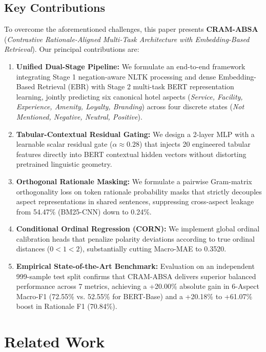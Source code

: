 \documentclass{llncs}
\begin{document}
\subsection{Key Contributions}
\label{subsec:key_contributions}
To overcome the aforementioned challenges, this paper presents \textbf{CRAM-ABSA} (\textit{Contrastive Rationale-Aligned Multi-Task Architecture with Embedding-Based Retrieval}). Our principal contributions are:
\begin{enumerate}[label=(\roman*)]
    \item \textbf{Unified Dual-Stage Pipeline:} We formulate an end-to-end framework integrating Stage 1 negation-aware NLTK processing and dense Embedding-Based Retrieval (EBR) with Stage 2 multi-task BERT representation learning, jointly predicting six canonical hotel aspects (\textit{Service, Facility, Experience, Amenity, Loyalty, Branding}) across four discrete states (\textit{Not Mentioned, Negative, Neutral, Positive}).
    \item \textbf{Tabular-Contextual Residual Gating:} We design a 2-layer MLP with a learnable scalar residual gate ($\alpha \approx 0.28$) that injects 20 engineered tabular features directly into BERT contextual hidden vectors without distorting pretrained linguistic geometry.
    \item \textbf{Orthogonal Rationale Masking:} We formulate a pairwise Gram-matrix orthogonality loss on token rationale probability masks that strictly decouples aspect representations in shared sentences, suppressing cross-aspect leakage from 54.47\% (BM25-CNN) down to 0.24\%.
    \item \textbf{Conditional Ordinal Regression (CORN):} We implement global ordinal calibration heads that penalize polarity deviations according to true ordinal distances ($0 < 1 < 2$), substantially cutting Macro-MAE to 0.3520.
    \item \textbf{Empirical State-of-the-Art Benchmark:} Evaluation on an independent 999-sample test split confirms that CRAM-ABSA delivers superior balanced performance across 7 metrics, achieving a +20.00\% absolute gain in 6-Aspect Macro-F1 (72.55\% vs. 52.55\% for BERT-Base) and a +20.18\% to +61.07\% boost in Rationale F1 (70.84\%).
\end{enumerate}

\section{Related Work}
\label{sec:related_work}
\end{document}
